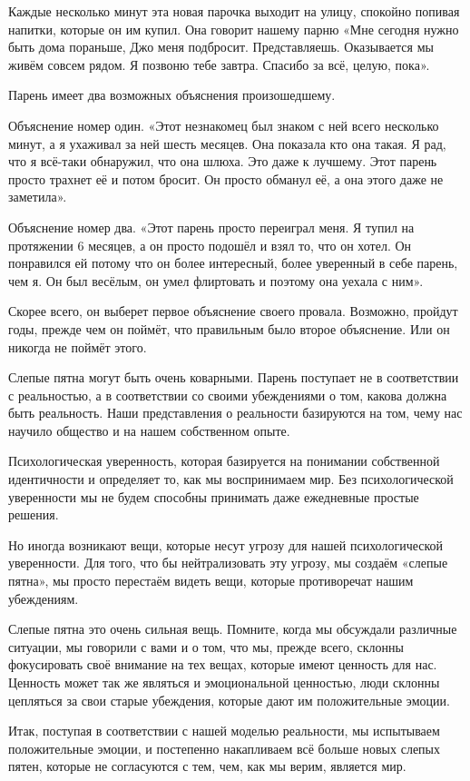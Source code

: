 Каждые несколько минут эта новая парочка выходит на улицу, спокойно попивая напитки, которые он им купил. Она говорит нашему парню «Мне сегодня нужно быть дома пораньше, Джо меня подбросит. Представляешь. Оказывается мы живём совсем рядом. Я позвоню тебе завтра. Спасибо за всё, целую, пока».

Парень имеет два возможных объяснения произошедшему.

Объяснение номер один. «Этот незнакомец был знаком с ней всего несколько минут, а я ухаживал за ней шесть месяцев. Она показала кто она такая. Я рад, что я всё-таки обнаружил, что она шлюха. Это даже к лучшему. Этот парень просто трахнет её и потом бросит. Он просто обманул её, а она этого даже не заметила».

Объяснение номер два. «Этот парень просто переиграл меня. Я тупил на протяжении 6 месяцев, а он просто подошёл и взял то, что он хотел. Он понравился ей потому что он более интересный, более уверенный в себе парень, чем я. Он был весёлым, он умел флиртовать и поэтому она уехала с ним».

Скорее всего, он выберет первое объяснение своего провала. Возможно, пройдут годы, прежде чем он поймёт, что правильным было второе объяснение. Или он никогда не поймёт этого.

Слепые пятна могут быть очень коварными. Парень поступает не в соответствии с реальностью, а в соответствии со своими убеждениями о том, какова должна быть реальность. Наши представления о реальности базируются на том, чему нас научило общество и на нашем собственном опыте.

Психологическая уверенность, которая базируется на понимании собственной идентичности и определяет то, как мы воспринимаем мир. Без психологической уверенности мы не будем способны принимать даже ежедневные простые решения.

Но иногда возникают вещи, которые несут угрозу для нашей психологической уверенности. Для того, что бы нейтрализовать эту угрозу, мы создаём «слепые пятна», мы просто перестаём видеть вещи, которые противоречат нашим убеждениям.

Слепые пятна это очень сильная вещь. Помните, когда мы обсуждали различные ситуации, мы говорили с вами и о том, что мы, прежде всего, склонны фокусировать своё внимание на тех вещах, которые имеют ценность для нас. Ценность может так же являться и эмоциональной ценностью, люди склонны цепляться за свои старые убеждения, которые дают им положительные эмоции.

Итак, поступая в соответствии с нашей моделью реальности, мы испытываем положительные эмоции, и постепенно накапливаем всё больше новых слепых пятен, которые не согласуются с тем, чем, как мы верим, является мир.

